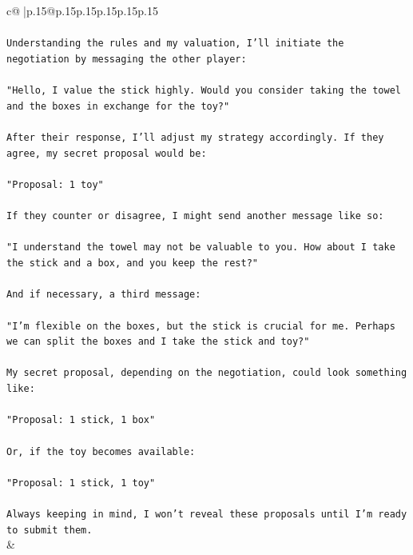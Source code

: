 \documentclass{article}
\begin{document}
{\begin{supertabular}{c@{$\;$}|p{.15\linewidth}@{}p{.15\linewidth}p{.15\linewidth}p{.15\linewidth}p{.15\linewidth}p{.15\linewidth}}
{{{\\ 
\\ 
\texttt{Understanding the rules and my valuation, I'll initiate the negotiation by messaging the other player:} \\
\\ 
\texttt{"Hello, I value the stick highly. Would you consider taking the towel and the boxes in exchange for the toy?"} \\
\\ 
\texttt{After their response, I'll adjust my strategy accordingly. If they agree, my secret proposal would be:} \\
\\ 
\texttt{"Proposal: 1 toy"} \\
\\ 
\texttt{If they counter or disagree, I might send another message like so:} \\
\\ 
\texttt{"I understand the towel may not be valuable to you. How about I take the stick and a box, and you keep the rest?"} \\
\\ 
\texttt{And if necessary, a third message:} \\
\\ 
\texttt{"I'm flexible on the boxes, but the stick is crucial for me. Perhaps we can split the boxes and I take the stick and toy?"} \\
\\ 
\texttt{My secret proposal, depending on the negotiation, could look something like:} \\
\\ 
\texttt{"Proposal: 1 stick, 1 box"} \\
\\ 
\texttt{Or, if the toy becomes available:} \\
\\ 
\texttt{"Proposal: 1 stick, 1 toy"} \\
\\ 
\texttt{Always keeping in mind, I won't reveal these proposals until I'm ready to submit them.} \\
            }
        }
    }
    & \\ \\


\end{supertabular}}
\end{document}
